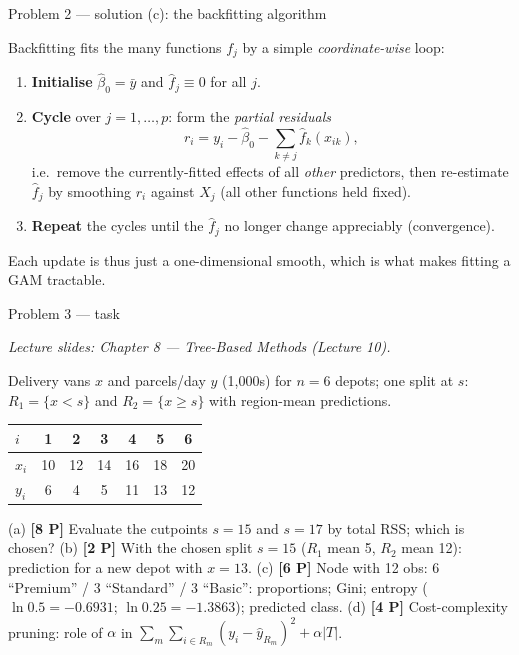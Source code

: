 \documentclass[aspectratio=169,11pt]{beamer}
\begin{document}
\begin{frame}{Problem 2 --- solution (c): the backfitting algorithm}
  \begin{solutionbox}
    Backfitting fits the many functions $f_j$ by a simple \emph{coordinate-wise} loop:
    \begin{enumerate}
      \item \textbf{Initialise} $\hat\beta_0=\bar y$ and $\hat f_j\equiv 0$ for all $j$.
      \item \textbf{Cycle} over $j=1,\dots,p$: form the \emph{partial residuals}
        \[
          r_i=y_i-\hat\beta_0-\sum_{k\ne j}\hat f_k(x_{ik}),
        \]
        i.e.\ remove the currently-fitted effects of all \emph{other} predictors, then re-estimate
        $\hat f_j$ by smoothing $r_i$ against $X_j$ (all other functions held fixed).
      \item \textbf{Repeat} the cycles until the $\hat f_j$ no longer change appreciably (convergence).
    \end{enumerate}
    Each update is thus just a one-dimensional smooth, which is what makes fitting a GAM tractable.
  \end{solutionbox}
\end{frame}

\begin{frame}{Problem 3 --- task}
  \begin{exercise}
    {\scriptsize\itshape Lecture slides: Chapter 8 --- Tree-Based Methods (Lecture 10).}\par\smallskip
    Delivery vans $x$ and parcels/day $y$ (1{,}000s) for $n=6$ depots;
    one split at $s$: $R_1=\{x<s\}$ and $R_2=\{x\ge s\}$ with region-mean predictions.
    \begin{center}\scriptsize
    \begin{tabular}{lcccccc}
      \toprule
      $i$ & 1 & 2 & 3 & 4 & 5 & 6\\
      \midrule
      $x_i$ & 10 & 12 & 14 & 16 & 18 & 20\\
      $y_i$ & 6 & 4 & 5 & 11 & 13 & 12\\
      \bottomrule
    \end{tabular}
    \end{center}
    (a) \textbf{[8 P]} Evaluate the cutpoints $s=15$ and $s=17$ by total RSS; which is chosen?
    (b) \textbf{[2 P]} With the chosen split $s=15$ ($R_1$ mean 5, $R_2$ mean 12): prediction for a new depot with $x=13$.
    (c) \textbf{[6 P]} Node with 12 obs: 6 ``Premium'' / 3 ``Standard'' / 3 ``Basic'':
        proportions; Gini; entropy ($\ln 0.5=-0.6931$; $\ln 0.25=-1.3863$); predicted class.
    (d) \textbf{[4 P]} Cost-complexity pruning: role of $\alpha$ in
        $\sum_m\sum_{i\in R_m}(y_i-\hat y_{R_m})^2+\alpha|T|$.
  \end{exercise}
\end{frame}
\end{document}
